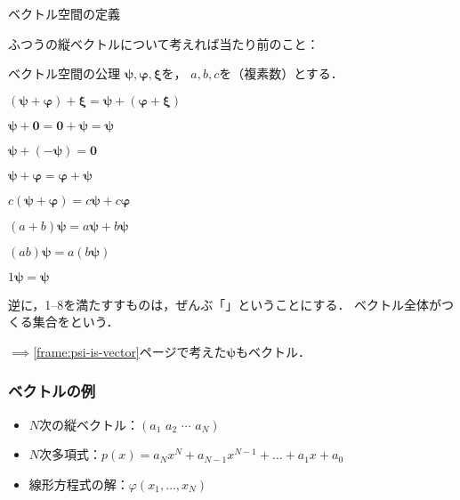 \documentclass[
    10pt,
    ]{sotsu-beamer}
\begin{document}
\begin{frame}{ベクトル空間の定義}

    ふつうの縦ベクトルについて考えれば当たり前のこと：
    \begin{block}{ベクトル空間の公理}
        $\symbf{\psi}, \symbf{\varphi}, \symbf{\xi}$を，
        $a, b, c$を（複素数）とする．
        \begin{enumerate}
            \begin{multicols}{2}
                \item $(\symbf{\psi} + \symbf{\varphi}) + \symbf{\xi} = \symbf{\psi} + (\symbf{\varphi} + \symbf{\xi})$
                \item $\symbf{\psi} + \symbf{0} = \symbf{0} + \symbf{\psi} = \symbf{\psi}$
                \item $\symbf{\psi} + (-\symbf{\psi}) = \symbf{0}$
                \item $\symbf{\psi} + \symbf{\varphi} = \symbf{\varphi} + \symbf{\psi}$
                \item $c (\symbf{\psi} + \symbf{\varphi}) = c \symbf{\psi} + c \symbf{\varphi}$
                \item $(a + b) \symbf{\psi} = a \symbf{\psi} + b \symbf{\psi}$
                \item $(ab) \symbf{\psi} = a(b\symbf{\psi})$
                \item $1 \symbf{\psi} = \symbf{\psi}$
            \end{multicols}
        \end{enumerate}
    \end{block}

    \pause

    \alert{逆に，1--8を満たすすものは，ぜんぶ「」ということにする}．
    ベクトル全体がつくる集合をという．
    
    $\implies$\ref{frame:psi-is-vector}ページで考えた$\symbf{\psi}$もベクトル．

\end{frame}


\begin{frame}
    \frametitle{ベクトルの例}

    \begin{itemize}
        \item $N$次の縦ベクトル：$(a_1 \,\, a_2 \,\, \cdots \,\, a_N)$
        \item $N$次多項式：$p(x) = a_N x^N + a_{N-1} x^{N-1} + \dots + a_1 x + a_0$
        \item 線形方程式の解：$\varphi(x_1, \dots, x_N)$
    \end{itemize}

    

\end{frame}
\end{document}
